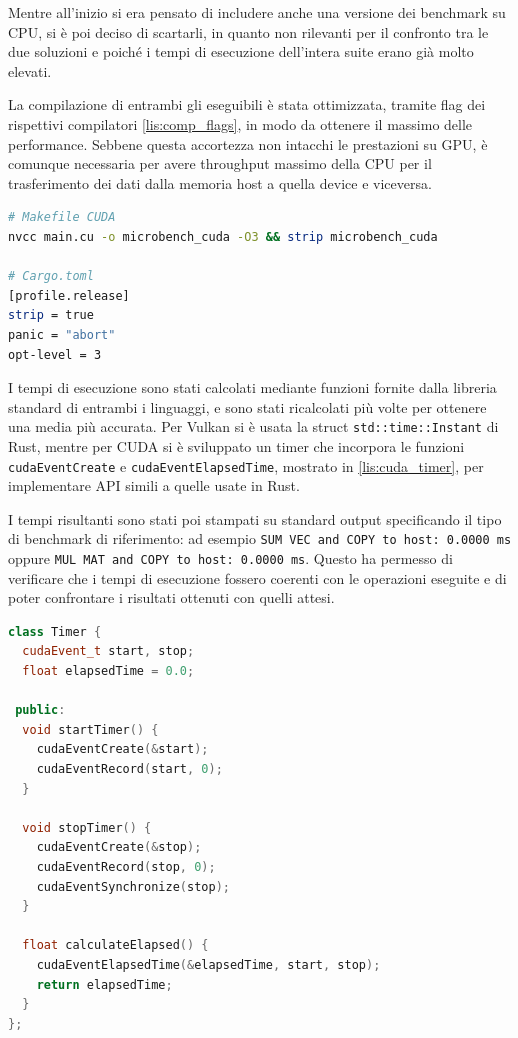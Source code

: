 Mentre all'inizio si era pensato di includere anche una versione dei benchmark su CPU, si è poi deciso di scartarli, in quanto non rilevanti per il confronto tra le due soluzioni e poiché i tempi di esecuzione dell'intera suite erano già molto elevati. 

La compilazione di entrambi gli eseguibili è stata ottimizzata, tramite flag dei rispettivi compilatori \ref{lis:comp_flags}, in modo da ottenere il massimo delle performance. Sebbene questa accortezza non intacchi le prestazioni su GPU, è comunque necessaria per avere throughput massimo della CPU per il trasferimento dei dati dalla memoria host a quella device e viceversa.

\vspace{5mm}
\begin{lstlisting}[language=bash, caption=Flag di compilazione CUDA e Rust, label=lis:comp_flags]
# Makefile CUDA
nvcc main.cu -o microbench_cuda -O3 && strip microbench_cuda

# Cargo.toml
[profile.release]
strip = true
panic = "abort"
opt-level = 3
\end{lstlisting}
\vspace{5mm}

I tempi di esecuzione sono stati calcolati mediante funzioni fornite dalla libreria standard di entrambi i linguaggi, e sono stati ricalcolati più volte per ottenere una media più accurata. Per Vulkan si è usata la struct \verb|std::time::Instant| di Rust, mentre per CUDA si è sviluppato un timer che incorpora le funzioni \verb|cudaEventCreate| e \verb|cudaEventElapsedTime|, mostrato in \ref{lis:cuda_timer}, per implementare API simili a quelle usate in Rust. 

I tempi risultanti sono stati poi stampati su standard output specificando il tipo di benchmark di riferimento: ad esempio \verb|SUM VEC and COPY to host: 0.0000 ms| oppure \verb|MUL MAT and COPY to host: 0.0000 ms|. Questo ha permesso di verificare che i tempi di esecuzione fossero coerenti con le operazioni eseguite e di poter confrontare i risultati ottenuti con quelli attesi. 

\newpage
\vspace{5mm}
\begin{lstlisting}[language=C++, caption=Timer CUDA, label=lis:cuda_timer]
class Timer {
  cudaEvent_t start, stop;
  float elapsedTime = 0.0;

 public:
  void startTimer() {
    cudaEventCreate(&start);
    cudaEventRecord(start, 0);
  }

  void stopTimer() {
    cudaEventCreate(&stop);
    cudaEventRecord(stop, 0);
    cudaEventSynchronize(stop);
  }

  float calculateElapsed() {
    cudaEventElapsedTime(&elapsedTime, start, stop);
    return elapsedTime;
  }
};
\end{lstlisting}
\vspace{5mm}



